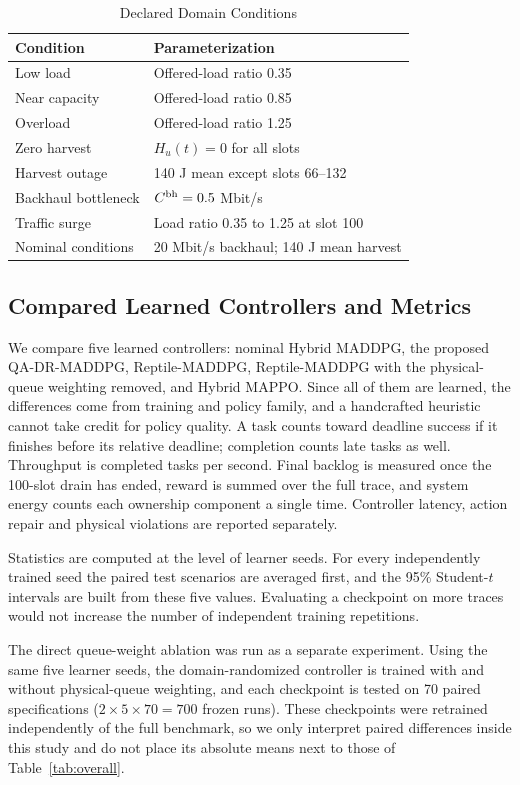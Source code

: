 \documentclass[journal]{IEEEtran}
\newcommand{\method}{QA-DR-MADDPG}
\begin{document}
\begin{table}[!t]
\caption{Declared Domain Conditions}
\label{tab:domains}
\centering
\footnotesize
\begin{tabular}{p{}p{}}
\toprule
Condition & Parameterization\\
\midrule
Low load & Offered-load ratio 0.35\\
Near capacity & Offered-load ratio 0.85\\
Overload & Offered-load ratio 1.25\\
Zero harvest & $H_u(t)=0$ for all slots\\
Harvest outage & 140 J mean except slots 66--132\\
Backhaul bottleneck & $C^{\rm bh}=0.5$ Mbit/s\\
Traffic surge & Load ratio 0.35 to 1.25 at slot 100\\
Nominal conditions & 20 Mbit/s backhaul; 140 J mean harvest\\
\bottomrule
\end{tabular}
\end{table}

\subsection{Compared Learned Controllers and Metrics}
We compare five learned controllers: nominal Hybrid MADDPG, the proposed
\method, Reptile-MADDPG, Reptile-MADDPG with the physical-queue weighting
removed, and Hybrid MAPPO. Since all of them are learned, the differences
come from training and policy family, and a handcrafted heuristic cannot
take credit for policy quality. A task counts toward deadline success if it
finishes before its relative deadline; completion counts late tasks as well.
Throughput is completed tasks per second. Final backlog is measured once the
100-slot drain has ended, reward is summed over the full trace, and system
energy counts each ownership component a single time. Controller latency,
action repair and physical violations are reported separately.

Statistics are computed at the level of learner seeds. For every
independently trained seed the paired test scenarios are averaged first, and
the 95\% Student-$t$ intervals are built from these five values. Evaluating a
checkpoint on more traces would not increase the number of independent
training repetitions.

The direct queue-weight ablation was run as a separate experiment. Using the
same five learner seeds, the domain-randomized controller is trained with and
without physical-queue weighting, and each checkpoint is tested on 70 paired
specifications ($2\times5\times70=700$ frozen runs). These checkpoints were
retrained independently of the full benchmark, so we only interpret paired
differences inside this study and do not place its absolute means next to
those of Table~\ref{tab:overall}.
\end{document}
